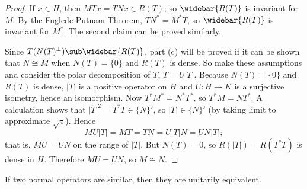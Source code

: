 \begin{proof}
If $x\in H$, then $MTx=TNx\in R(T)$; so $\widebar{R(T)}$ is invariant for $M$. By the Fuglede-Putnam Theorem, $TN^*=M^*T$, so $\widebar{R(T)}$ is invariant for $M^*$. The second claim can be proved similarly.\par
Since $T(N(T)^\bot)\sub\widebar{R(T)}$, part (c) will be proved if it can be shown that $N\cong M$ when $N(T)=\{0\}$ and $R(T)$ is dense. So make these assumptions and consider the polar decomposition of $T$, $T=U|T|$. Because $N(T)=\{0\}$ and $R(T)$ is dense, $|T|$ is a positive operator on $H$ and $U:H\to K$ is a surjective isometry, hence an isomorphism. Now $T^*M^*=N^*T^*$, so $T^*M=NT^*$. A calculation shows that $|T|^2=T^*T\in\{N\}'$, so $|T|\in\{N\}'$ (by taking limit to approximate $\sqrt{z}$). Hence
\[MU|T|=MT=TN=U|T|N=UN|T|;\]
that is, $MU=UN$ on the range of $|T|$. But $N(T)=0$, so $R(|T|)=R(T^*T)$ is dense in $H$. Therefore $MU=UN$, so $M\cong N$.
\end{proof}
\begin{corollary}
If two normal operators are similar, then they are unitarily equivalent.
\end{corollary}
